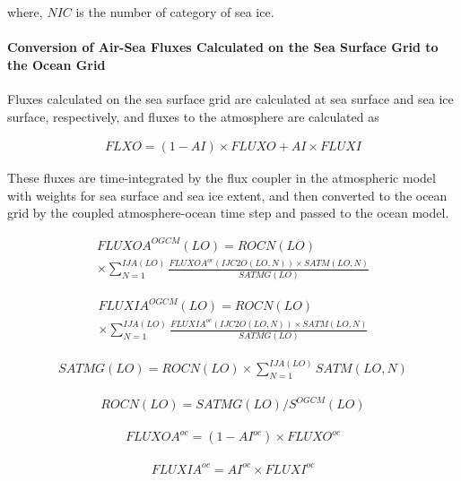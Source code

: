 where, \(NIC\) is the number of category of sea ice.

\hypertarget{conversion-of-air-sea-fluxes-calculated-on-the-sea-surface-grid-to-the-ocean-grid}{%
\paragraph{Conversion of Air-Sea Fluxes Calculated on the Sea Surface Grid to the Ocean Grid}\label{conversion-of-air-sea-fluxes-calculated-on-the-sea-surface-grid-to-the-ocean-grid}}

Fluxes calculated on the sea surface grid are calculated at sea surface and sea ice surface, respectively, and fluxes to the atmosphere are calculated as

\begin{eqnarray} FLXO=(1-AI) \times FLUXO+AI \times FLUXI \end{eqnarray}

These fluxes are time-integrated by the flux coupler in the atmospheric model with weights for sea surface and sea ice extent, and then converted to the ocean grid by the coupled atmosphere-ocean time
step and passed to the ocean model.

\begin{eqnarray} FLUXOA^{OGCM}(LO) = ROCN(LO) \\ \times \sum_{N=1}^{IJA(LO)} \frac{FLUXOA^{oc}(IJC2O(LO,N)) \times SATM(LO,N)}{SATMG(LO)} \end{eqnarray}

\begin{eqnarray} FLUXIA^{OGCM}(LO) = ROCN(LO) \\ \times \sum_{N=1}^{IJA(LO)} \frac{FLUXIA^{oc}(IJC2O(LO,N)) \times SATM(LO,N)}{SATMG(LO)} \end{eqnarray}

\begin{eqnarray} SATMG(LO)=ROCN(LO) \times \sum_{N=1}^{IJA(LO)} SATM(LO,N) \end{eqnarray}

\begin{eqnarray} ROCN(LO)=SATMG(LO)/S^{OGCM}(LO) \end{eqnarray}

\begin{eqnarray} FLUXOA^{oc}=(1-AI^{oc}) \times FLUXO^{oc} \end{eqnarray}

\begin{eqnarray} FLUXIA^{oc}=AI^{oc} \times FLUXI^{oc} \end{eqnarray}

